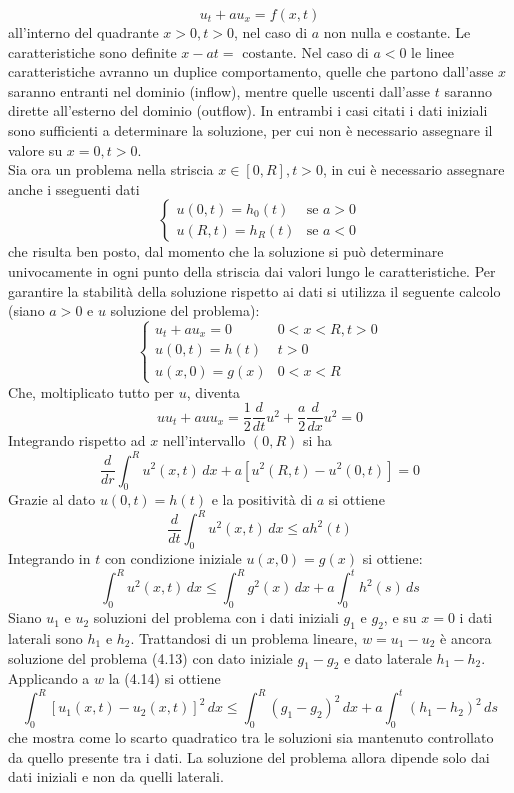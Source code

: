 \documentclass[a4paper,12pt, draft]{article}
\theoremstyle{break}
\numberwithin{equation}{section}
\begin{document}
\[
  u_t + au_x = f(x,t)
\]
all'interno del quadrante \(x>0, t>0\), nel caso di \(a\) non nulla e costante. Le caratteristiche sono definite
\(x -at = \mbox{ costante}\).
Nel caso di \(a < 0\) le linee caratteristiche avranno un duplice comportamento, quelle che partono dall'asse \(x\) saranno entranti nel dominio (inflow), mentre quelle uscenti dall'asse \(t\) saranno dirette all'esterno del dominio (outflow). In entrambi i casi citati i dati iniziali sono sufficienti a determinare la soluzione, per cui non è necessario assegnare il valore su \(x = 0, t > 0\). \\
Sia ora un problema nella striscia \(x \in [0, R], t > 0\), in cui è necessario assegnare anche i sseguenti dati 
\[
\begin{cases}
  u(0,t) = h_0(t) & \mbox{se } a > 0 \\
  u(R,t) = h_R(t) & \mbox{se } a < 0
\end{cases}  
\]
che risulta ben posto, dal momento che la soluzione si può determinare univocamente in ogni punto della striscia dai valori lungo le caratteristiche. Per garantire la stabilità della soluzione rispetto ai dati si utilizza il seguente calcolo (siano \(a > 0\) e \(u\) soluzione del problema):
\begin{equation}
  \begin{cases}
    u_t +au_x = 0 & 0 < x < R, t > 0 \\
    u(0, t) = h(t) & t > 0 \\
    u(x, 0) = g(x) & 0 < x < R
  \end{cases}
\end{equation}
Che, moltiplicato tutto per \(u\), diventa
\[
  uu_t + auu_x = \frac{1}{2} \frac{d}{dt}u^2 + \frac{a}{2}\frac{d}{dx}u^2 = 0
\]
Integrando rispetto ad \(x\) nell'intervallo \((0, R)\) si ha
\[
\frac{d}{dr} \int_0^R u^2(x,t) \, dx + a[u^2(R,t) - u^2(0,t)] = 0  
\]
Grazie al dato \(u(0,t) = h(t)\) e la positività di \(a\) si ottiene
\[
  \frac{d}{dt} \int_0^R u^2(x,t) \, dx \leq ah^2(t)
\]
Integrando in \(t\) con condizione iniziale \(u(x,0) = g(x)\) si ottiene:
\begin{equation}
  \int_0^R u^2(x,t) \, dx \leq \int_0^R g^2(x) \, dx + a\int_0^t h^2(s) \, ds
\end{equation}
Siano \(u_1\) e \(u_2\) soluzioni del problema con i dati iniziali \(g_1\) e \(g_2\), e su \(x= 0\) i dati laterali sono \(h_1 \mbox{ e } h_2\). Trattandosi di un problema lineare, \(w = u_1 - u_2\) è ancora soluzione del problema (4.13) con dato iniziale \(g_1 - g_2\) e dato laterale \(h_1 - h_2\). Applicando a \(w\) la (4.14) si ottiene
\[
  \int_0^R [u_1(x,t) - u_2(x,t)]^2 \, dx \leq \int_0^R (g_1 - g_2)^2 \, dx + a\int_0^t(h_1 - h_2)^2 \, ds
\]
che mostra come lo scarto quadratico tra le soluzioni sia mantenuto controllato da quello presente tra i dati. La soluzione del problema allora dipende solo dai dati iniziali e non da quelli laterali.
\end{document}
